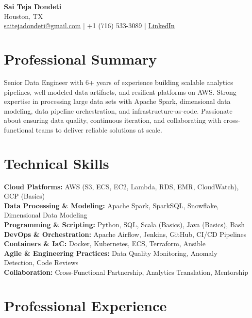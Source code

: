 \documentclass[10pt]{article}
\begin{document}
\begin{center}
    {\LARGE \textbf{Sai Teja Dondeti}} \\
    \vspace{2pt}
    Houston, TX \\
    \href{mailto:saitejadondeti@gmail.com}{saitejadondeti@gmail.com} \;|\;
    +1 (716) 533-3089 \;|\;
    \href{https://www.linkedin.com/in/sai-teja-dondeti/}{LinkedIn}
\end{center}

\section*{Professional Summary}
Senior Data Engineer with 6+ years of experience building scalable analytics pipelines, well-modeled data artifacts, and resilient platforms on AWS. Strong expertise in processing large data sets with Apache Spark, dimensional data modeling, data pipeline orchestration, and infrastructure-as-code. Passionate about ensuring data quality, continuous iteration, and collaborating with cross-functional teams to deliver reliable solutions at scale.

\section*{Technical Skills}

\textbf{Cloud Platforms:} AWS (S3, ECS, EC2, Lambda, RDS, EMR, CloudWatch), GCP (Basics) \\
\textbf{Data Processing \& Modeling:} Apache Spark, SparkSQL, Snowflake, Dimensional Data Modeling \\
\textbf{Programming \& Scripting:} Python, SQL, Scala (Basics), Java (Basics), Bash \\
\textbf{DevOps \& Orchestration:} Apache Airflow, Jenkins, GitHub, CI/CD Pipelines \\
\textbf{Containers \& IaC:} Docker, Kubernetes, ECS, Terraform, Ansible \\
\textbf{Agile \& Engineering Practices:} Data Quality Monitoring, Anomaly Detection, Code Reviews \\
\textbf{Collaboration:} Cross-Functional Partnership, Analytics Translation, Mentorship

\section*{Professional Experience}
\end{document}
